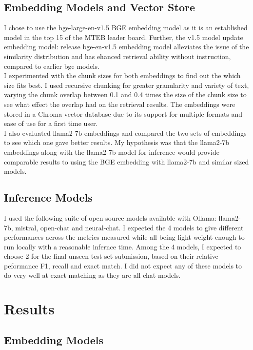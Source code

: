 \documentclass[11pt]{article}
\begin{document}
\subsection{Embedding Models and Vector Store}
I chose to use the bge-large-en-v1.5 BGE embedding model as it is an established model in the top 15 of the MTEB leader board. Further, the v1.5 model update embedding model: release bge-en-v1.5 embedding model alleviates the issue of the similarity distribution and has ehanced retrieval ability without instruction, compared to earlier bge models.
\\
I experimented with the chunk sizes for both embeddings to find out the which size fits best.
I used recursive chunking for greater granularity and variety of text, varying the chunk overlap between 0.1 and 0.4 times the size of the chunk size to see what effect the overlap had on the retrieval results.  The embeddings were stored in a Chroma vector database due to its support for multiple formats and ease of use for a first time user.
\\
I also evaluated llama2-7b embeddings and compared the two sets of embeddings to see which one gave better results. My hypothesis was that the llama2-7b embeddings along with the llama2-7b model for inference would provide comparable results to using the BGE embedding with llama2-7b and similar sized models.
\subsection{Inference Models}
I used the following suite of open source models available with Ollama: llama2-7b, mistral, open-chat and neural-chat. I expected the 4 models to give different performances across the metrics measured while all being light weight enough to run locally with a reasonable infernce time.
Among the 4 models, I expected to choose 2 for the final unseen test set submission, based on their relative peformance F1, recall and exact match. I did not expect any of these models to do very well at exact matching as they are all chat models.

\section{Results}

\subsection{Embedding Models}
\end{document}
